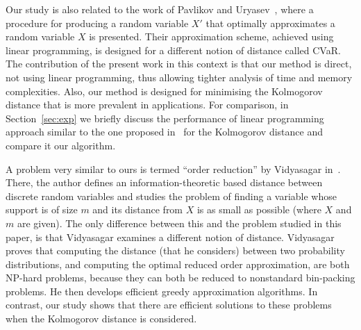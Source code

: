 \documentclass[letterpaper]{article} %
\begin{document}

Our study is also related to the work of Pavlikov and Uryasev~\cite{pavlikov2016cvar}, where a procedure for producing a random variable $X'$ that optimally approximates a random variable $X$ is presented. Their approximation scheme, achieved using linear programming, is designed for a different notion of distance called CVaR. The contribution of the present work in this context is that our method is direct, not using linear programming, thus allowing tighter analysis of time and memory complexities. Also, our method is designed for minimising the Kolmogorov distance that is more prevalent in applications. For comparison, in Section~\ref{sec:exp} we briefly discuss the performance of linear programming approach similar to the one proposed in~\cite{pavlikov2016cvar} for the Kolmogorov distance and compare it our algorithm. 

A problem very similar to ours is termed ``order reduction'' by Vidyasagar in~\cite{vidyasagar2012metric}. There, the author defines an information-theoretic based distance between discrete random variables and studies the problem of finding a variable whose support is of size $m$ and its distance from $X$ is as small as possible (where $X$ and $m$ are given). The only difference between this and the problem studied in this paper, is that Vidyasagar examines a different notion of distance. Vidyasagar proves that computing the distance (that he considers) between two probability distributions, and computing the optimal reduced order approximation, are both NP-hard problems, because they can both be reduced to nonstandard bin-packing problems. He then develops efficient greedy approximation algorithms. In contrast, our study shows that there are efficient solutions to these problems when the Kolmogorov distance is considered. 
\end{document}
